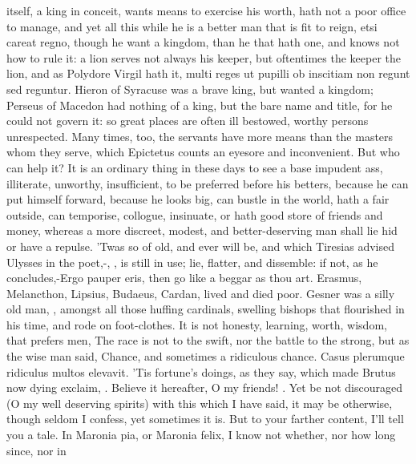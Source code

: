 {itself, a king in conceit, wants means to exercise his worth, hath not
a poor office to manage, and yet all this while he is a better man that
is fit to reign, etsi careat regno, though he want a kingdom,
than he that hath one, and knows not how to rule it: a lion
serves not always his keeper, but oftentimes the keeper the lion, and
as Polydore Virgil hath it, multi reges ut pupilli ob inscitiam
non regunt sed reguntur. Hieron of Syracuse was a brave king, but
wanted a kingdom; Perseus of Macedon had nothing of a king, but the
bare name and title, for he could not govern it: so great places are
often ill bestowed, worthy persons unrespected. Many times, too, the
servants have more means than the masters whom they serve, which
Epictetus counts an eyesore and inconvenient. But who can help
it? It is an ordinary thing in these days to see a base impudent ass,
illiterate, unworthy, insufficient, to be preferred before his betters,
because he can put himself forward, because he looks big, can bustle in
the world, hath a fair outside, can temporise, collogue, insinuate, or
hath good store of friends and money, whereas a more discreet, modest,
and better-deserving man shall lie hid or have a repulse. 'Twas so of
old, and ever will be, and which Tiresias advised Ulysses in the 
poet,-, \etc{}, is still in use; lie,
flatter, and dissemble: if not, as he concludes,-Ergo pauper eris, then
go like a beggar as thou art. Erasmus, Melancthon, Lipsius, Budaeus,
Cardan, lived and died poor. Gesner was a silly old man, , amongst all those huffing cardinals, swelling bishops that
flourished in his time, and rode on foot-clothes. It is not honesty,
learning, worth, wisdom, that prefers men, The race is not to the
swift, nor the battle to the strong, but as the wise man said,
Chance, and sometimes a ridiculous chance. Casus plerumque
ridiculus multos elevavit. 'Tis fortune's doings, as they say, which
made Brutus now dying exclaim, 
. Believe it hereafter, O my friends! . Yet be
not discouraged (O my well deserving spirits) with this which I have
said, it may be otherwise, though seldom I confess, yet sometimes it
is. But to your farther content, I'll tell you a tale. In Maronia
pia, or Maronia felix, I know not whether, nor how long since, nor in
}

